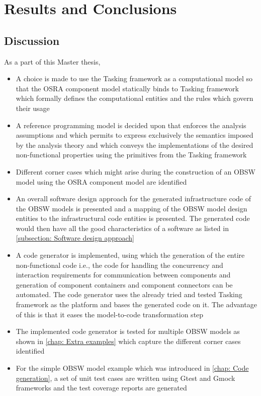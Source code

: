 
\chapter{Results and Conclusions}
\label{chap:conclusion}

\section{Discussion}
As a part of this Master thesis, 
\begin{itemize}
\item A choice is made to use the Tasking framework as a computational model so that the OSRA component model statically binds to Tasking framework which formally defines the computational entities and the rules which govern their usage 
\item A reference programming model is decided upon that enforces the analysis assumptions and which permits to express exclusively the semantics imposed by the analysis theory and which conveys the implementations of the desired non-functional properties using the primitives from the Tasking framework
\item Different corner cases which might arise during the construction of an OBSW model using the OSRA component model are identified 
\item An overall software design approach for the generated infrastructure code of the OBSW models is presented and a mapping of the OBSW model design entities to the infrastructural code entities is presented. The generated code would then have all the good characteristics of a software as listed in \cref{subsection: Software design approach} 
\item A code generator is implemented, using which the generation of the entire non-functional code i.e., the code for handling the concurrency and interaction requirements for communication between components and generation of component containers and component connectors can be automated. The code generator uses the already tried and tested Tasking framework as the platform and bases the generated code on it. The advantage of this is that it eases the model-to-code transformation step 
\item The implemented code generator is tested for multiple OBSW models as shown in \cref{chap: Extra examples} which capture the different corner cases identified
\item For the simple OBSW model example which was introduced in \cref{chap: Code generation}, a set of unit test cases are written using Gtest and Gmock frameworks and the test coverage reports are generated
\end{itemize}

